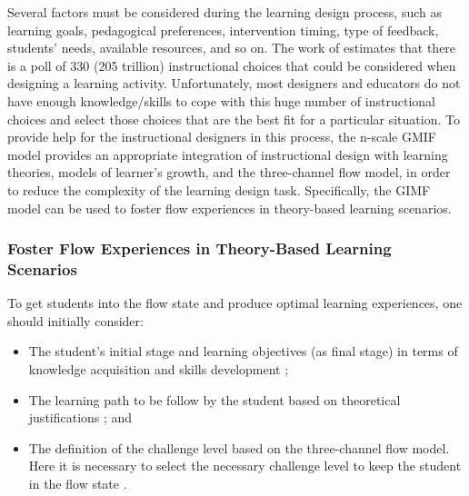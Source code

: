 Several factors must be considered during the learning design process, such as learning goals, pedagogical preferences, intervention timing, type of feedback, students’ needs, available resources, and so on. The work of  estimates that there is a poll of 330 (205 trillion) instructional choices that could be considered when designing a learning activity. Unfortunately, most designers and educators do not have enough knowledge/skills to cope with this huge number of instructional choices and select those choices that are the best fit for a particular situation. To provide help for the instructional designers in this process, the n-scale GMIF model provides an appropriate integration of instructional design with learning theories, models of learner’s growth, and the three-channel flow model, in order to reduce the complexity of the learning design task. Specifically, the GIMF model can be used to foster flow experiences in theory-based learning scenarios.

\subsubsection*{Foster Flow Experiences in Theory-Based Learning Scenarios}

To get students into the flow state and produce optimal learning experiences, one should initially consider: 

\begin{itemize}
\item The student's initial stage and learning objectives (as final stage) in terms of knowledge acquisition and skills development \cite{Anderson1982,RumelhartNorman1976};
\item The learning path to be follow by the student based on theoretical justifications \cite{IsotaniMizoguchiInabaIkeda2010,Romiszowski1981}; and 
\item The definition of the challenge level based on the three-channel flow model. Here it is necessary to select the necessary challenge level to keep the student in the flow state \cite{Csikszentmihalyi2014,DMello2012}. 
\end{itemize}


